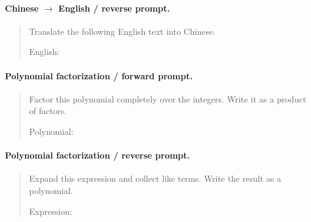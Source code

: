\paragraph{Chinese $\to$ English / reverse prompt.}
\begin{quote}\small\ttfamily
Translate the following English text into Chinese.\par \par English:\par <INPUT B>
\end{quote}
\paragraph{Polynomial factorization / forward prompt.}
\begin{quote}\small\ttfamily
Factor this polynomial completely over the integers. Write it as a product of factors.\par \par Polynomial:\par <INPUT A>
\end{quote}
\paragraph{Polynomial factorization / reverse prompt.}
\begin{quote}\small\ttfamily
Expand this expression and collect like terms. Write the result as a polynomial.\par \par Expression:\par <INPUT B>
\end{quote}
